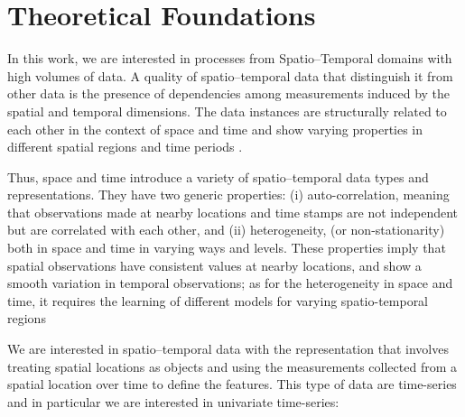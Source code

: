 \chapter{Theoretical Foundations}\label{chapter_Theoretical_Foundations}



In this work, we are interested in processes from Spatio--Temporal domains with high volumes of data. 
A quality of spatio--temporal data that distinguish it from other data is the presence of dependencies among measurements induced by the spatial and temporal dimensions. The data instances are structurally related to each other in the context of space and time and show varying properties in different spatial regions and time periods \cite{Atluri2018}. 

Thus, space and time introduce a variety of spatio--temporal data types and representations. They have two generic properties: (i) auto-correlation, meaning that observations made at nearby locations and time stamps are not independent but are correlated with each other, and (ii) heterogeneity, (or non-stationarity) both in space and time in varying ways and levels. These properties imply that spatial observations have consistent values at nearby locations, and show a smooth variation in temporal observations; as for the heterogeneity in space and time, it requires the learning of different models for varying spatio-temporal regions \cite{Wikle2019}

We are interested in spatio--temporal data with the representation that involves treating spatial locations as objects and using the measurements collected from a spatial location over time to define the features. This type of data are time-series and in particular we are interested in univariate time-series:

